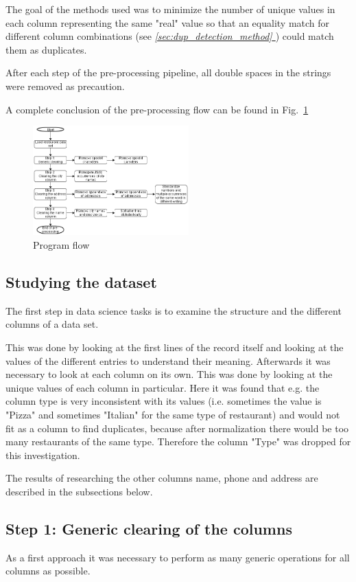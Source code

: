 \documentclass[conference]{IEEEtran}
\newcommand*{\fullref}[1]{\textit{\hyperref[{#1}]{\autoref*{#1} \nameref*{#1}}}}
\begin{document}
The goal of the methods used was to minimize the number of unique values in each column representing the same "real" value so that an equality match for different column combinations (see \fullref{sec:dup_detection_method}) could match them as duplicates.

After each step of the pre-processing pipeline, all double spaces in the strings were removed as precaution.

A complete conclusion of the pre-processing flow can be found in Fig.~\ref{fig:program_flow}
\begin{figure}[htbp]
	\centerline{\includegraphics[width=6cm]{figures/program_flow.png}}
	\caption{Program flow}
	\label{fig:program_flow}
\end{figure}
\subsection{Studying the dataset}
The first step in data science tasks is to examine the structure and the different columns of a data set. 

This was done by looking at the first lines of the record itself and looking at the values of the different entries to understand their meaning. Afterwards it was necessary to look at each column on its own. This was done by looking at the unique values of each column in particular. Here it was found that e.g. the column type is very inconsistent with its values (i.e. sometimes the value is "Pizza" and sometimes "Italian" for the same type of restaurant) and would not fit as a column to find duplicates, because after normalization there would be too many restaurants of the same type. Therefore the column "Type" was dropped for this investigation.

The results of researching the other columns name, phone and address are described in the subsections below.
\subsection{Step 1: Generic clearing of the columns}
As a first approach it was necessary to perform as many generic operations for all columns as possible. 
\end{document}
